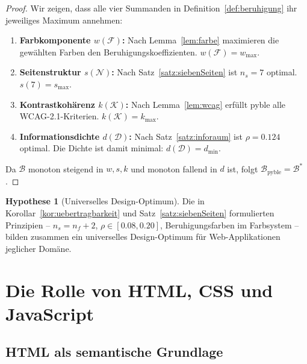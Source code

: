 ﻿\documentclass[a4paper,12pt]{article}
\theoremstyle{definition}
\newtheorem{hypothese}{Hypothese}
\begin{document}
\begin{proof}
    Wir zeigen, dass alle vier Summanden in Definition~\ref{def:beruhigung}
    ihr jeweiliges Maximum annehmen:

    \begin{enumerate}
        \item \textbf{Farbkomponente $w(\mathcal{F})$:}
              Nach Lemma~\ref{lem:farbe} maximieren die gewählten Farben
              den Beruhigungskoeffizienten. $w(\mathcal{F}) = w_{\max}$.

        \item \textbf{Seitenstruktur $s(\mathcal{N})$:}
              Nach Satz~\ref{satz:siebenSeiten} ist $n_s = 7$ optimal.
              $s(7) = s_{\max}$.

        \item \textbf{Kontrastkohärenz $k(\mathcal{K})$:}
              Nach Lemma~\ref{lem:wcag} erfüllt pyble alle WCAG-2.1-Kriterien.
              $k(\mathcal{K}) = k_{\max}$.

        \item \textbf{Informationsdichte $d(\mathcal{D})$:}
              Nach Satz~\ref{satz:inforaum} ist $\rho = 0.124$ optimal.
              Die Dichte ist damit minimal: $d(\mathcal{D}) = d_{\min}$.
    \end{enumerate}

    Da $\mathcal{B}$ monoton steigend in $w, s, k$ und monoton fallend in $d$
    ist, folgt $\mathcal{B}_{\text{pyble}} = \mathcal{B}^*$.
\end{proof}

\begin{hypothese}[Universelles Design-Optimum]
\label{hyp:universell}
    Die in Korollar~\ref{kor:uebertragbarkeit} und Satz~\ref{satz:siebenSeiten}
    formulierten Prinzipien -- $n_s = n_f + 2$, $\rho \in [0.08, 0.20]$,
    Beruhigungsfarben im Farbsystem -- bilden zusammen ein universelles
    Design-Optimum für Web-Applikationen jeglicher Domäne.
\end{hypothese}

\section{Die Rolle von HTML, CSS und JavaScript}

\subsection{HTML als semantische Grundlage}
\end{document}
